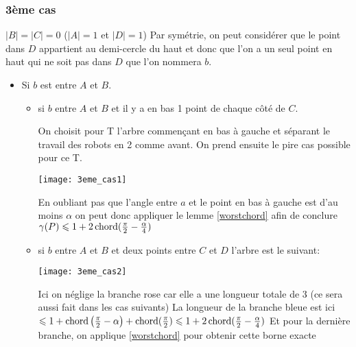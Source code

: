 \subsubsection*{3ème cas}\label{3cas} $|B| = |C| = 0$ ($|A| = 1$ et $|D| = 1$)
Par symétrie, on peut considérer que le point dans $D$ appartient au demi-cercle du haut et donc que l'on a un seul point en haut qui ne soit pas dans $D$ que l'on nommera $b$.

\begin{itemize}

\item \label{3cas1} Si $b$ est entre $A$ et $B$.

\begin{itemize}

\item \label{3cas11} si $b$ entre $A$ et $B$ et il y a en bas 1 point de chaque
  côté de $C$.

On choisit pour T l'arbre commençant en bas à gauche et séparant le travail des robots en 2 comme avant.
On prend ensuite le pire cas possible pour ce T.

  \texttt{[image: 3eme\_cas1]}

En oubliant pas que l'angle entre $a$ et le point en bas à gauche est d'au moins $\alpha$ on peut donc appliquer le lemme \ref{worstchord} afin de conclure
$\gamma(P) \leqslant 1 + 2\operatorname{chord}(\frac{\pi}{2} - \frac{\alpha}{4})$

\item \label{3cas12} si $b$ entre $A$ et $B$ et deux points entre $C$ et $D$
l'arbre est le suivant:

  \texttt{[image: 3eme\_cas2]}

Ici on néglige la branche rose car elle a une longueur totale de 3 (ce sera aussi fait dans les cas suivants)
La longueur de la branche bleue est ici $\leqslant 1+\operatorname{chord}\left(\frac{\pi}{2} - \alpha\right)+\operatorname{chord}(\frac{\pi}{2}) \leqslant 1 + 2\operatorname{chord}(\frac{\pi}{2} - \frac{\alpha}{4})$
Et pour la dernière branche, on applique \ref{worstchord} pour obtenir cette borne exacte


\end{itemize}
\end{itemize}
